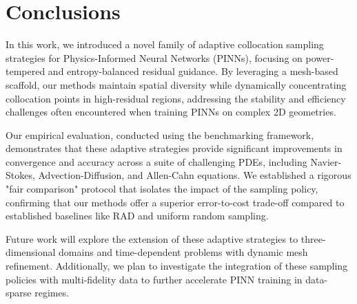 \section{Conclusions}
\label{sec:conclusions}

In this work, we introduced a novel family of adaptive collocation sampling strategies for Physics-Informed Neural Networks (PINNs), focusing on power-tempered and entropy-balanced residual guidance. By leveraging a mesh-based scaffold, our methods maintain spatial diversity while dynamically concentrating collocation points in high-residual regions, addressing the stability and efficiency challenges often encountered when training PINNs on complex 2D geometries.

Our empirical evaluation, conducted using the \pinnpoint benchmarking framework, demonstrates that these adaptive strategies provide significant improvements in convergence and accuracy across a suite of challenging PDEs, including Navier-Stokes, Advection-Diffusion, and Allen-Cahn equations. We established a rigorous "fair comparison" protocol that isolates the impact of the sampling policy, confirming that our methods offer a superior error-to-cost trade-off compared to established baselines like RAD and uniform random sampling.

Future work will explore the extension of these adaptive strategies to three-dimensional domains and time-dependent problems with dynamic mesh refinement. Additionally, we plan to investigate the integration of these sampling policies with multi-fidelity data to further accelerate PINN training in data-sparse regimes.
